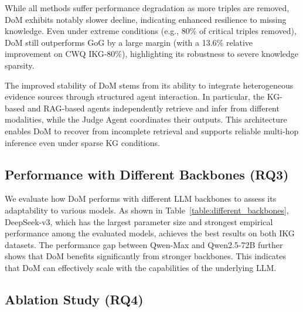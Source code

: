 While all methods suffer performance degradation as more triples are removed, DoM exhibits notably slower decline, indicating enhanced resilience to missing knowledge. Even under extreme conditions (e.g., 80\% of critical triples removed), DoM still outperforms GoG by a large margin (with a 13.6\% relative improvement on CWQ IKG-80\%), highlighting its robustness to severe knowledge sparsity.


The improved stability of DoM stems from its ability to integrate heterogeneous evidence sources through structured agent interaction. In particular, the KG-based and RAG-based agents independently retrieve and infer from different modalities, while the Judge Agent coordinates their outputs. This architecture enables DoM to recover from incomplete retrieval and supports reliable multi-hop inference even under sparse KG conditions.


\subsection{Performance with Different Backbones (RQ3)}

We evaluate how DoM performs with different LLM backbones to assess its adaptability to various models. As shown in Table~\ref{table:different_backbones}, DeepSeek-v3, which has the largest parameter size and strongest empirical performance among the evaluated models, achieves the best results on both IKG datasets. The performance gap between Qwen-Max and Qwen2.5-72B further shows that DoM benefits significantly from stronger backbones. This indicates that DoM can effectively scale with the capabilities of the underlying LLM.

\subsection{Ablation Study (RQ4)}

% 


